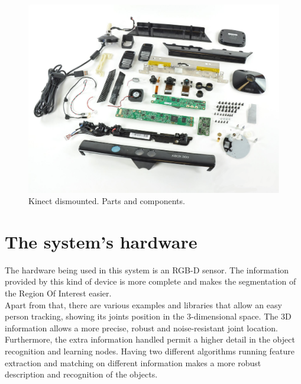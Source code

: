 \begin{figure}[h]
	\begin{center}
	\includegraphics[scale=0.2]{img/kinect/kinect_parts.eps}
	\caption[Kinect Parts]{Kinect dismounted. Parts and components.}
	\end{center}

\end{figure}


\section*{The system's hardware}

The hardware being used in this system is an RGB-D sensor. The information provided by this kind of device is more complete and makes the segmentation of the Region Of Interest easier. 
\\

Apart from that, there are various examples and libraries that allow an easy person tracking, showing its joints position in the 3-dimensional space. The 3D information allows a more precise, robust and noise-resistant joint location.
\\

Furthermore, the extra information handled permit a higher detail in the object recognition and learning nodes. Having two different algorithms running feature extraction and matching on different information makes a more robust description and recognition of the objects. 

